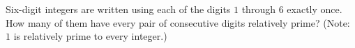 Six-digit integers are written using each of the digits $1$ through $6$ exactly once. How many of them have every pair of consecutive digits relatively prime? (Note: $1$ is relatively prime to every integer.)
